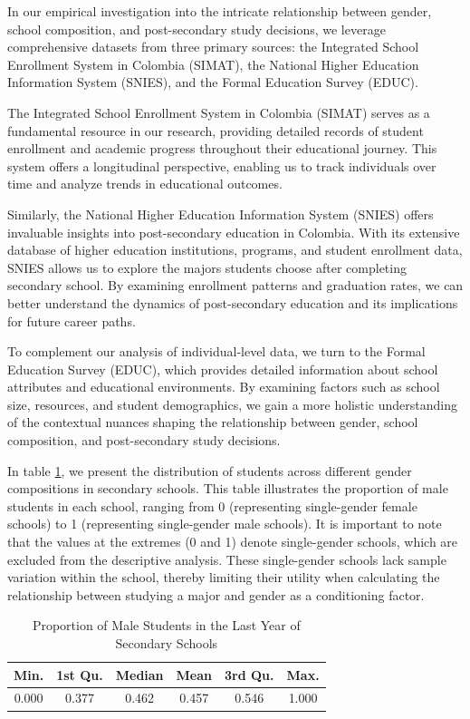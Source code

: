In our empirical investigation into the intricate relationship between gender, school composition, and post-secondary study decisions, we leverage comprehensive datasets from three primary sources: the Integrated School Enrollment System in Colombia (SIMAT), the National Higher Education Information System (SNIES), and the Formal Education Survey (EDUC).

The Integrated School Enrollment System in Colombia (SIMAT) serves as a fundamental resource in our research, providing detailed records of student enrollment and academic progress throughout their educational journey. This system offers a longitudinal perspective, enabling us to track individuals over time and analyze trends in educational outcomes.

Similarly, the National Higher Education Information System (SNIES) offers invaluable insights into post-secondary education in Colombia. With its extensive database of higher education institutions, programs, and student enrollment data, SNIES allows us to explore the majors students choose after completing secondary school. By examining enrollment patterns and graduation rates, we can better understand the dynamics of post-secondary education and its implications for future career paths.

To complement our analysis of individual-level data, we turn to the Formal Education Survey (EDUC), which provides detailed information about school attributes and educational environments. By examining factors such as school size, resources, and student demographics, we gain a more holistic understanding of the contextual nuances shaping the relationship between gender, school composition, and post-secondary study decisions.


In table \ref{tab:gender_dist2}, we present the distribution of students across different gender compositions in secondary schools. This table illustrates the proportion of male students in each school, ranging from 0 (representing single-gender female schools) to 1 (representing single-gender male schools). It is important to note that the values at the extremes (0 and 1) denote single-gender schools, which are excluded from the descriptive analysis. These single-gender schools lack sample variation within the school, thereby limiting their utility when calculating the relationship between studying a major and gender as a conditioning factor.

\begin{table}[!htbp] 
    \centering
    \begin{tabular}{cccccc}
    \hline \hline 
         Min. & 1st Qu. & Median  &  Mean & 3rd Qu.  &  Max.          \\\hline  \hline 
         0.000 &  0.377 & 0.462 & 0.457 & 0.546 &  1.000         \\
    \hline
    \end{tabular}
\caption{Proportion of Male Students in the Last Year of Secondary Schools}
\label{tab:gender_dist2}
\end{table}


